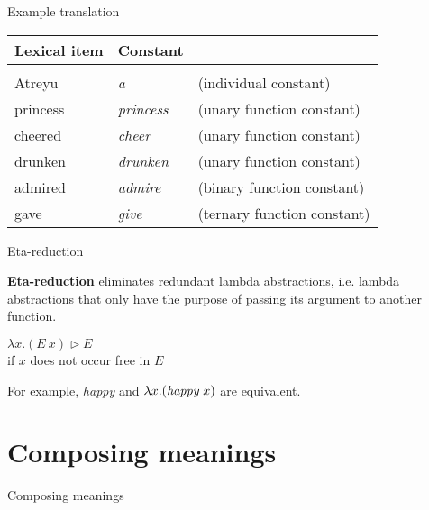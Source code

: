 \documentclass[xcolor=dvipsnames]{beamer}
\begin{document}
\begin{frame}{Example translation}

\begin{center}
\begin{tabular}{lll}
\hline 
Lexical item & Constant & \\
\hline \\[-1ex]
Atreyu & {\em a} & (individual constant) \\
princess & {\em princess} & (unary function constant) \\
cheered & {\em cheer} & (unary function constant) \\
drunken & {\em drunken} & (unary function constant) \\
admired & {\em admire} & (binary function constant) \\
gave & {\em give} & (ternary function constant) \\[1ex]
\hline
\end{tabular}
\end{center}
\end{frame}

\begin{frame}{Eta-reduction}

{\bf Eta-reduction} eliminates redundant lambda abstractions,
i.e. lambda abstractions that only have the purpose 
of passing its argument to another function.

\begin{center}
{$\lambda x.(E\ x) \rhd E$ \\
if $x$ does not occur free in $E$ }
\end{center}

For example, {\em happy} and $\lambda x.(\text{\em happy}\ x)$ are equivalent.
\end{frame}

\section{Composing meanings}

\begin{frame}{}

\begin{center}
{\Large Composing meanings}
\end{center}
\end{frame}
\end{document}

